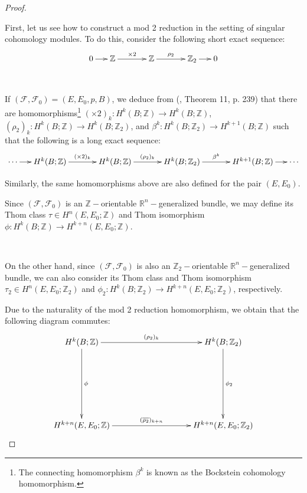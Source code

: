 \documentclass[12pt,oneside]{book}
\newcommand{\R}{\mathbb{R}}
\newcommand{\Z}{\mathbb{Z}}
\begin{document}
    \begin{proof}

        \

        First, let us see how to construct a mod 2 reduction in the setting of singular cohomology modules. To do this, consider the 
        following short exact sequence:
        $$ \xymatrix @C=0.5cm { 0\ar[r] & \Z \ar[rr]^-{\times 2} && \Z \ar[rr]^-{\rho_{2}} && \Z_{2} \ar[r] & 0 } $$

        \

        If $(\mathcal{F},\mathcal{F}_{0})=(E,E_{0},p,B)$, we deduce from (\cite{spanier}, Theorem 11, p. 239) that there are 
        homomorphisms\footnote{The connecting homomorphism $\beta^{k}$ is known as the Bockstein cohomology 
        homomorphism.} 
        $(\times 2)_{k}:H^{k}(B;\Z)\to H^{k}(B;\Z)$, $(\rho_{2})_{k}:H^{k}(B;\Z)\to H^{k}(B;\Z_{2})$, and 
        $\beta^{k}:H^{k}(B;\Z_{2})\to H^{k+1}(B;\Z)$ such that the following is a long exact sequence:
        $$ \xymatrix @C=0.5cm { \cdots \ar[r] & H^{k}(B;\Z) \ar[rr]^-{(\times 2)_{k}} && H^{k}(B;\Z) \ar[rr]^-{(\rho_{2})_{k}} && H^{k}(B;\Z_{2}) \ar[rr]^-{\beta^{k}} && H^{k+1}(B;\Z) \ar[r] & \cdots } $$

        Similarly, the same homomorphisms above are also defined for the pair $(E,E_{0})$.

        Since $(\mathcal{F},\mathcal{F}_{0})$ is an $\Z-$orientable $\R^{n}-$generalized bundle, we may define its Thom class 
        $\tau\in H^{n}(E,E_{0};\Z)$ and Thom isomorphism $\phi:H^{k}(B;\Z)\to H^{k+n}(E,E_{0};\Z)$.

        \

        On the other hand, since $(\mathcal{F},\mathcal{F}_{0})$ is also an $\Z_{2}-$orientable $\R^{n}-$generalized bundle, we can also 
        consider its Thom class and Thom isomorphism $\tau_{2}\in H^{n}(E,E_{0};\Z_{2})$ and 
        $\phi_{2}:H^{k}(B;\Z_{2})\to H^{k+n}(E,E_{0};\Z_{2})$, respectively.

        Due to the naturality of the mod 2 reduction homomorphism, we obtain that the following diagram commutes:
        $$ \xymatrix @C=0.5cm {
        	H^{k}(B;\Z) \ar[rrrrr]^-{(\rho_{2})_{k}} \ar[ddd]^-{\phi} &&&&& H^{k}(B;\Z_{2}) \ar[ddd]^-{\phi_{2}} \\
        	&&&&& \\		 
        	&&&&& \\		 
        	H^{k+n}(E,E_{0};\Z) \ar[rrrrr]^-{(\overline{\rho_{2}})_{k+n}} &&&&& H^{k+n}(E,E_{0};\Z_{2})
        } $$


\end{proof}
\end{document}
